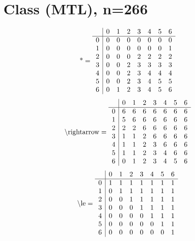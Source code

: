 \documentclass[11pt]{article}
\begin{document}
\section{Class (MTL), n=266}
\[\text{*} = 
\begin{array}{r | r r r r r r r}
 & 0 & 1 & 2 & 3 & 4 & 5 & 6 \\ \hline
0 & 0 & 0 & 0 & 0 & 0 & 0 & 0 \\
1 & 0 & 0 & 0 & 0 & 0 & 0 & 1 \\
2 & 0 & 0 & 0 & 2 & 2 & 2 & 2 \\
3 & 0 & 0 & 2 & 3 & 3 & 3 & 3 \\
4 & 0 & 0 & 2 & 3 & 4 & 4 & 4 \\
5 & 0 & 0 & 2 & 3 & 4 & 5 & 5 \\
6 & 0 & 1 & 2 & 3 & 4 & 5 & 6 \\
\end{array}
\]
\[\text{\textbackslash rightarrow} = 
\begin{array}{r | r r r r r r r}
 & 0 & 1 & 2 & 3 & 4 & 5 & 6 \\ \hline
0 & 6 & 6 & 6 & 6 & 6 & 6 & 6 \\
1 & 5 & 6 & 6 & 6 & 6 & 6 & 6 \\
2 & 2 & 2 & 6 & 6 & 6 & 6 & 6 \\
3 & 1 & 1 & 2 & 6 & 6 & 6 & 6 \\
4 & 1 & 1 & 2 & 3 & 6 & 6 & 6 \\
5 & 1 & 1 & 2 & 3 & 4 & 6 & 6 \\
6 & 0 & 1 & 2 & 3 & 4 & 5 & 6 \\
\end{array}
\]
\[\text{\textbackslash le} = 
\begin{array}{r | r r r r r r r}
 & 0 & 1 & 2 & 3 & 4 & 5 & 6 \\ \hline
0 & 1 & 1 & 1 & 1 & 1 & 1 & 1 \\
1 & 0 & 1 & 1 & 1 & 1 & 1 & 1 \\
2 & 0 & 0 & 1 & 1 & 1 & 1 & 1 \\
3 & 0 & 0 & 0 & 1 & 1 & 1 & 1 \\
4 & 0 & 0 & 0 & 0 & 1 & 1 & 1 \\
5 & 0 & 0 & 0 & 0 & 0 & 1 & 1 \\
6 & 0 & 0 & 0 & 0 & 0 & 0 & 1 \\
\end{array}
\]
\end{document}
